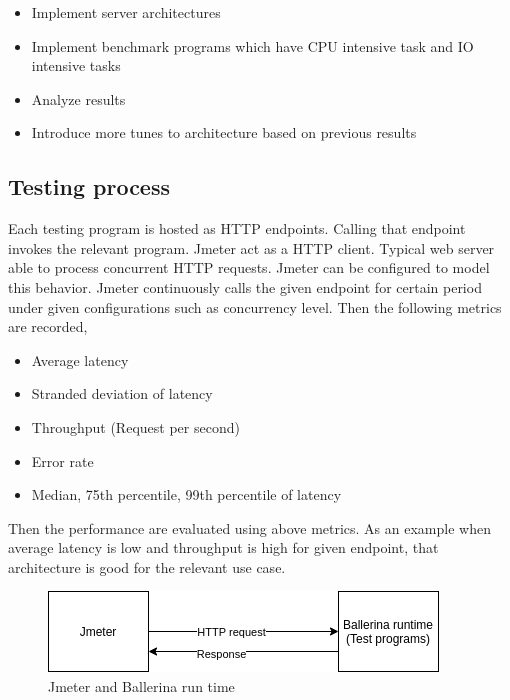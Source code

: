 \begin{itemize}
	\item Implement server architectures
	\item Implement benchmark programs which have CPU intensive task and IO intensive tasks
	\item Analyze results
	\item Introduce more tunes to architecture based on previous results
\end{itemize} 

\subsection{Testing process}

Each testing program is hosted as HTTP endpoints. Calling that endpoint invokes the relevant program. Jmeter act as a HTTP client. Typical web server able to process concurrent HTTP requests. Jmeter can be configured to model this behavior. Jmeter continuously calls the given endpoint for certain period under given configurations such as concurrency level. Then the following metrics are recorded,

\begin{itemize}
	\item Average latency
	\item Stranded deviation of latency
	\item Throughput (Request per second)
	\item Error rate
	\item Median, 75th percentile, 99th percentile of latency
\end{itemize} 

Then the performance are evaluated using above metrics. As an example when average latency is low and throughput is high for given endpoint, that architecture is good for the relevant use case. 
  

\begin{figure}[htbp]
	\begin{center}
		\includegraphics[scale=0.5]{figures/jmeter_bal.png}
	\end{center}
	\caption{Jmeter and Ballerina run time}
	\label{jmeter_testing}
\end{figure}



